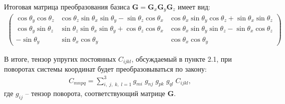 	Итоговая матрица преобразования базиса $\mathbf{G} = \mathbf{G}_{x}\mathbf{G}_{y}\mathbf{G}_{z}$ имеет вид:
\begin{align}
\label{rotation_mat}
\left( \begin{array}{cccccccccccc}
\cos \theta_{y} \cos \theta_{z} & \cos \theta_{z} \sin \theta_{x} \sin \theta_{y} - \sin \theta_{z} \cos \theta_{x} & \cos \theta_{x} \sin \theta_{y} \cos \theta_{z} + \sin \theta_{x} \sin \theta_{z} \\ 
\cos \theta_{y} \sin \theta_{z} & \sin \theta_{z} \sin \theta_{x} \sin \theta_{y} + \cos \theta_{z} \cos \theta_{x} & \cos \theta_{x} \sin \theta_{y} \sin \theta_{z} - \sin \theta_{x} \cos \theta_{z} \\ 
- \sin \theta_{y} & \sin \theta_{x} \cos \theta_{y} & \cos \theta_{x} \cos \theta_{y}
\end{array} \right)
\end{align}


	В итоге, тензор упругих постоянных $C_{ijkl}$, обсуждаемый в пункте 2.1, при поворотах системы координат будет преобразовываться по закону:
\begin{align}
	C_{mnpq} = \sum_{i,\;j,\;k,\;l = 1}^{3} g_{mi}\;g_{nj}\;g_{pk}\;g_{ql}\;C_{ijkl},
\end{align}
	где $g_{ij}$ -- тензор поворота, соответствующий матрице $\mathbf{G}$.
